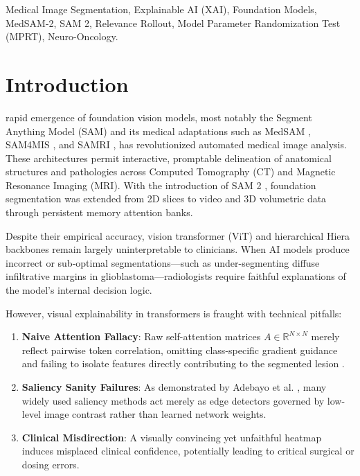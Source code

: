 \documentclass[journal,10pt,twocolumn]{IEEEtran}
\begin{document}
\begin{IEEEkeywords}
Medical Image Segmentation, Explainable AI (XAI), Foundation Models, MedSAM-2, SAM 2, Relevance Rollout, Model Parameter Randomization Test (MPRT), Neuro-Oncology.
\end{IEEEkeywords}

\section{Introduction}
 rapid emergence of foundation vision models, most notably the Segment Anything Model (SAM) and its medical adaptations such as MedSAM \cite{wang2024medsam}, SAM4MIS \cite{zhang2023sam4mis}, and SAMRI \cite{wang2024samri}, has revolutionized automated medical image analysis. These architectures permit interactive, promptable delineation of anatomical structures and pathologies across Computed Tomography (CT) and Magnetic Resonance Imaging (MRI). With the introduction of SAM 2 \cite{ravi2024sam2}, foundation segmentation was extended from 2D slices to video and 3D volumetric data through persistent memory attention banks.

Despite their empirical accuracy, vision transformer (ViT) and hierarchical Hiera backbones remain largely uninterpretable to clinicians. When AI models produce incorrect or sub-optimal segmentations---such as under-segmenting diffuse infiltrative margins in glioblastoma---radiologists require faithful explanations of the model's internal decision logic. 

However, visual explainability in transformers is fraught with technical pitfalls:
\begin{enumerate}
    \item \textbf{Naive Attention Fallacy}: Raw self-attention matrices $A \in \mathbb{R}^{N \times N}$ merely reflect pairwise token correlation, omitting class-specific gradient guidance and failing to isolate features directly contributing to the segmented lesion \cite{chefer2021transformer,chefer2021generic}.
    \item \textbf{Saliency Sanity Failures}: As demonstrated by Adebayo et al. \cite{adebayo2018sanity}, many widely used saliency methods act merely as edge detectors governed by low-level image contrast rather than learned network weights.
    \item \textbf{Clinical Misdirection}: A visually convincing yet unfaithful heatmap induces misplaced clinical confidence, potentially leading to critical surgical or dosing errors.
\end{enumerate}
\end{document}
